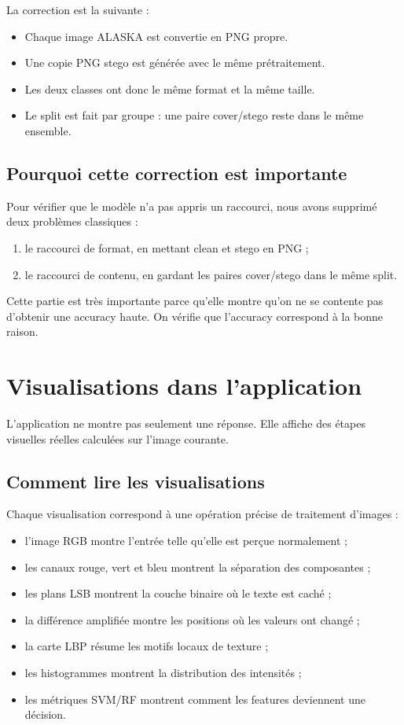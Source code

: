 \documentclass[11pt,a4paper]{article}
\begin{document}
La correction est la suivante :
\begin{itemize}
  \item Chaque image ALASKA est convertie en PNG propre.
  \item Une copie PNG stego est générée avec le même prétraitement.
  \item Les deux classes ont donc le même format et la même taille.
  \item Le split est fait par groupe : une paire cover/stego reste dans le même ensemble.
\end{itemize}

\subsection*{Pourquoi cette correction est importante}
Pour vérifier que le modèle n'a pas appris un raccourci, nous avons supprimé deux problèmes classiques :
\begin{enumerate}
  \item le raccourci de format, en mettant clean et stego en PNG ;
  \item le raccourci de contenu, en gardant les paires cover/stego dans le même split.
\end{enumerate}

Cette partie est très importante parce qu'elle montre qu'on ne se contente pas d'obtenir une accuracy haute. On vérifie que l'accuracy correspond à la bonne raison.

\section{Visualisations dans l'application}
L'application ne montre pas seulement une réponse. Elle affiche des étapes visuelles réelles calculées sur l'image courante.

\subsection*{Comment lire les visualisations}
Chaque visualisation correspond à une opération précise de traitement d'images :
\begin{itemize}
  \item l'image RGB montre l'entrée telle qu'elle est perçue normalement ;
  \item les canaux rouge, vert et bleu montrent la séparation des composantes ;
  \item les plans LSB montrent la couche binaire où le texte est caché ;
  \item la différence amplifiée montre les positions où les valeurs ont changé ;
  \item la carte LBP résume les motifs locaux de texture ;
  \item les histogrammes montrent la distribution des intensités ;
  \item les métriques SVM/RF montrent comment les features deviennent une décision.
\end{itemize}
\end{document}
